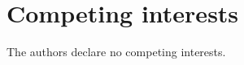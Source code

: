 \documentclass[fleqn,10pt]{wlscirep}
\begin{document}
\section*{Competing interests}

The authors declare no competing interests.


\end{document}
